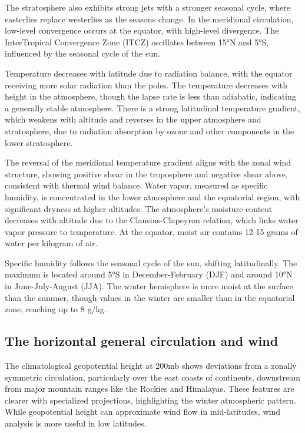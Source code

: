 The stratosphere also exhibits strong jets with a stronger seasonal cycle, where easterlies replace westerlies as the seasons change. In the meridional circulation, low-level convergence occurs at the equator, with high-level divergence. The InterTropical Convergence Zone (ITCZ) oscillates between 15°N and 5°S, influenced by the seasonal cycle of the sun.

Temperature decreases with latitude due to radiation balance, with the equator receiving more solar radiation than the poles. The temperature decreases with height in the atmosphere, though the lapse rate is less than adiabatic, indicating a generally stable atmosphere. There is a strong latitudinal temperature gradient, which weakens with altitude and reverses in the upper atmosphere and stratosphere, due to radiation absorption by ozone and other components in the lower stratosphere.

The reversal of the meridional temperature gradient aligns with the zonal wind structure, showing positive shear in the troposphere and negative shear above, consistent with thermal wind balance. Water vapor, measured as specific humidity, is concentrated in the lower atmosphere and the equatorial region, with significant dryness at higher altitudes. The atmosphere's moisture content decreases with altitude due to the Clausius-Clapeyron relation, which links water vapor pressure to temperature. At the equator, moist air contains 12-15 grams of water per kilogram of air.

Specific humidity follows the seasonal cycle of the sun, shifting latitudinally. The maximum is located around 5°S in December-February (DJF) and around 10°N in June-July-August (JJA). The winter hemisphere is more moist at the surface than the summer, though values in the winter are smaller than in the equatorial zone, reaching up to 8 g/kg.

\subsection{The horizontal general circulation and wind }

The climatological geopotential height at 200mb shows deviations from a zonally symmetric circulation, particularly over the east coasts of continents, downstream from major mountain ranges like the Rockies and Himalayas. These features are clearer with specialized projections, highlighting the winter atmospheric pattern. While geopotential height can approximate wind flow in mid-latitudes, wind analysis is more useful in low latitudes.

